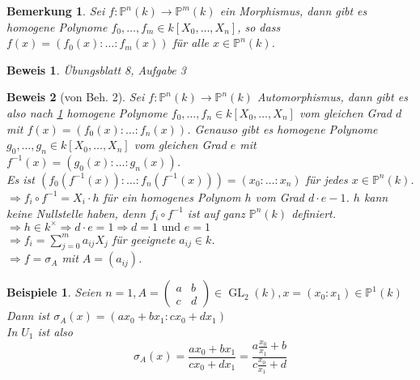 \documentclass[a4paper,12pt]{report}
\theoremstyle{break}
\newtheorem{Bem}[Def]{Bemerkung}
\theoremstyle{nonumberbreak}
\newtheorem{nnBsp}{Beispiele}
\theoremstyle{nonumberplain}
\newtheorem{Bew}{Beweis}
\begin{document}
\begin{Bem}
\label{bem:11.5}
Sei $f: \mathbb{P}^n(k) \to \mathbb{P}^m(k)$ ein Morphismus, dann gibt es homogene Polynome $f_0, \dots, f_m \in k[X_0,\dots,X_n]$, so dass $f(x) = (f_0(x):\dots:f_m(x))$ für alle $x \in \mathbb{P}^n(k)$.
\end{Bem}
\begin{Bew}
Übungsblatt 8, Aufgabe 3
\end{Bew}
\begin{Bew}[von Beh. 2]
Sei $f: \mathbb{P}^n(k) \to \mathbb{P}^n(k)$ Automorphismus, dann gibt es also nach \ref{bem:11.5} homogene Polynome $f_0,\dots,f_n \in k[X_0,\dots,X_n]$ vom gleichen Grad $d$ mit $f(x) = (f_0(x):\dots:f_n(x))$. Genauso gibt es homogene Polynome $g_0,\dots,g_n \in k[X_0,\dots,X_n]$ vom gleichen Grad $e$ mit $f^{-1}(x) = (g_0(x):\dots:g_n(x))$.\\
Es ist $(f_0(f^{-1}(x)): \dots : f_n( f^{-1}(x)) ) = (x_0: \dots : x_n)$ für jedes $x \in \mathbb{P}^n(k)$.\\
$\Rightarrow f_i \circ f^{-1} = X_i \cdot h$ für ein homogenes Polynom $h$ vom Grad $d\cdot e -1$. $h$ kann keine Nullstelle haben, denn $f_i \circ f^{-1}$ ist auf ganz $\mathbb{P}^n(k)$ definiert.\\
$\Rightarrow h \in k^\times \Rightarrow d \cdot e = 1 \Rightarrow d = 1 \text{ und } e = 1$\\
$\Rightarrow f_i = \sum_{j=0}^m a_{ij} X_j$ für geeignete $a_{ij} \in k$.\\
$\Rightarrow f = \sigma_A$ mit $A = (a_{ij})$.
\end{Bew}
 
\begin{nnBsp}
Seien
$ n = 1, A = \begin{pmatrix} a& b \\ c & d \end{pmatrix} \in \operatorname{GL}_2(k), x = (x_0: x_1) \in \mathbb{P}^1(k) $
\\ Dann ist 
$ \sigma_A(x) = (ax_0 + bx_1 : cx_0 + dx_1)$\\
In $U_1$ ist also \[\sigma_A(x) = \frac{ax_0 + bx_1}{cx_0 + dx_1} = \frac{a\frac{x_0}{x_1} + b}{c\frac{x_0}{x_1} + d}\]
\end{nnBsp}
 
\end{document}
